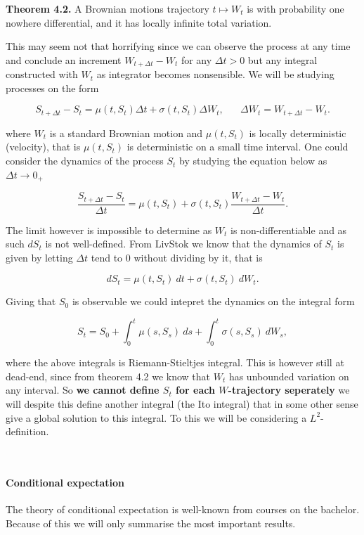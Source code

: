 \documentclass[
]{article}
\begin{document}
\textbf{Theorem 4.2.} A Brownian motions trajectory \(t\mapsto W_t\) is
with probability one nowhere differential, and it has locally infinite
total variation.

This may seem not that horrifying since we can observe the process at
any time and conclude an increment \(W_{t+\Delta t}-W_t\) for any
\(\Delta t>0\) but any integral constructed with \(W_t\) as integrator
becomes nonsensible. We will be studying processes on the form

\[S_{t+\Delta t}-S_t=\mu(t,S_t)\Delta t+\sigma(t,S_t)\Delta W_t,\hspace{20pt}\Delta W_t=W_{t+\Delta t}-W_t.\]

where \(W_t\) is a standard Brownian motion and \(\mu(t,S_t)\) is
locally deterministic (velocity), that is \(\mu(t,S_t)\) is
deterministic on a small time interval. One could consider the dynamics
of the process \(S_t\) by studying the equation below as
\(\Delta t\to 0_+\)

\[\frac{S_{t+\Delta t}-S_t}{\Delta t}=\mu(t,S_t)+\sigma(t,S_t)\frac{W_{t+\Delta t}-W_t}{\Delta t}.\]

The limit however is impossible to determine as \(W_t\) is
non-differentiable and as such \(dS_t\) is not well-defined. From
LivStok we know that the dynamics of \(S_t\) is given by letting
\(\Delta t\) tend to 0 without dividing by it, that is

\[
dS_t=\mu(t,S_t)\ dt+\sigma(t,S_t)\ dW_t.
\]

Giving that \(S_0\) is observable we could intepret the dynamics on the
integral form

\[
S_t=S_0+\int_0^t\mu(s,S_s)\ ds+\int_0^t\sigma(s,S_s)\ dW_s,
\]

where the above integrals is Riemann-Stieltjes integral. This is however
still at dead-end, since from theorem 4.2 we know that \(W_t\) has
unbounded variation on any interval. So \textbf{we cannot define \(S_t\)
for each \(W\)-trajectory seperately} we will despite this define
another integral (the Ito integral) that in some other sense give a
global solution to this integral. To this we will be considering a
\(L^2\)-definition.

~

\hypertarget{conditional-expectation}{%
\paragraph{Conditional expectation}\label{conditional-expectation}}

The theory of conditional expectation is well-known from courses on the
bachelor. Because of this we will only summarise the most important
results.
\end{document}
